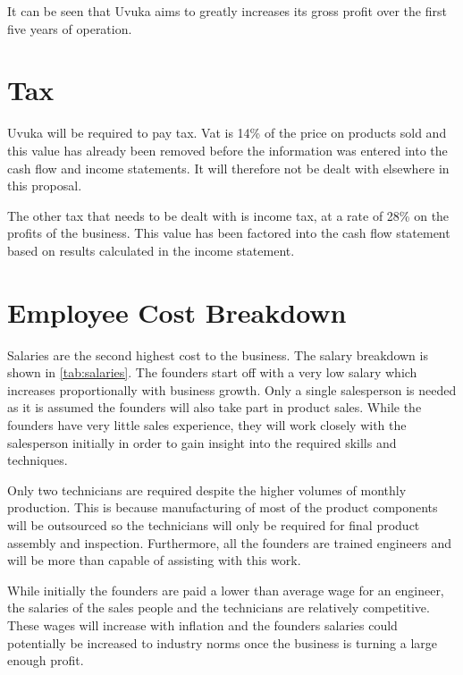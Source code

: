 It can be seen that Uvuka aims to greatly increases its gross profit over the first five years of operation. 

\section{Tax}

Uvuka will be required to pay tax. Vat is 14\% of the price on products sold and this value has already been removed before the information was entered into the cash flow and income statements. It will therefore not be dealt with elsewhere in this proposal.

The other tax that needs to be dealt with is income tax, at a rate of 28\% on the profits of the business. This value has been factored into the cash flow statement based on results calculated in the income statement.

\section{Employee Cost Breakdown}
Salaries are the second highest cost to the business. The salary breakdown is shown in \cref{tab:salaries}. The founders start off with a very low salary which increases proportionally with business growth. Only a single salesperson is needed as it is assumed the founders will also take part in product sales. While the founders have very little sales experience, they will work closely with the salesperson initially in order to gain insight into the required skills and techniques.

Only two technicians are required despite the higher volumes of monthly production. This is because manufacturing of most of the product components will be outsourced so the technicians will only be required for final product assembly and inspection. Furthermore, all the founders are trained engineers and will be more than capable of assisting with this work.

While initially the founders are paid a lower than average wage for an engineer, the salaries of the sales people and the technicians are relatively competitive. These wages will increase with inflation and the founders salaries could potentially be increased to industry norms once the business is turning a large enough profit.

